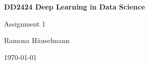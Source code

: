 \begin{titlepage}
\begin{center}
	\vspace{3em}	
    {\Huge\bfseries DD2424 Deep Learning in Data Science\par}
    \vspace{2em}
    {\huge Assignment 1 \par}
    \vspace{3em}
    {\Large Ramona Häuselmann\par}
	\vspace{1em}
    \today
\end{center}
\end{titlepage}
